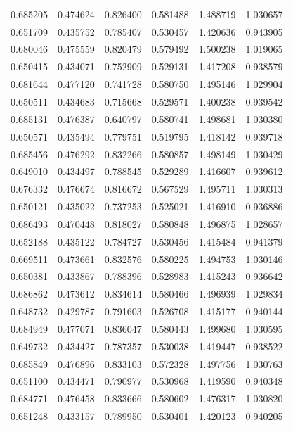 \begin{table}[htbp]
\begin{center}
\begin{tabular}{ |c|c|c|c|c|c| }
        0.685205 & 0.474624 & 0.826400 & 0.581488 & 1.488719 & 1.030657 \\
        0.651709 & 0.435752 & 0.785407 & 0.530457 & 1.420636 & 0.943905 \\
        0.680046 & 0.475559 & 0.820479 & 0.579492 & 1.500238 & 1.019065 \\
        0.650415 & 0.434071 & 0.752909 & 0.529131 & 1.417208 & 0.938579 \\
        0.681644 & 0.477120 & 0.741728 & 0.580750 & 1.495146 & 1.029904 \\
        0.650511 & 0.434683 & 0.715668 & 0.529571 & 1.400238 & 0.939542 \\
        0.685131 & 0.476387 & 0.640797 & 0.580741 & 1.498681 & 1.030380 \\
        0.650571 & 0.435494 & 0.779751 & 0.519795 & 1.418142 & 0.939718 \\
        0.685456 & 0.476292 & 0.832266 & 0.580857 & 1.498149 & 1.030429 \\
        0.649010 & 0.434497 & 0.788545 & 0.529289 & 1.416607 & 0.939612 \\
        0.676332 & 0.476674 & 0.816672 & 0.567529 & 1.495711 & 1.030313 \\
        0.650121 & 0.435022 & 0.737253 & 0.525021 & 1.416910 & 0.936886 \\
        0.686493 & 0.470448 & 0.818027 & 0.580848 & 1.496875 & 1.028657 \\
        0.652188 & 0.435122 & 0.784727 & 0.530456 & 1.415484 & 0.941379 \\
        0.669511 & 0.473661 & 0.832576 & 0.580225 & 1.494753 & 1.030146 \\
        0.650381 & 0.433867 & 0.788396 & 0.528983 & 1.415243 & 0.936642 \\
        0.686862 & 0.473612 & 0.834614 & 0.580466 & 1.496939 & 1.029834 \\
        0.648732 & 0.429787 & 0.791603 & 0.526708 & 1.415177 & 0.940144 \\
        0.684949 & 0.477071 & 0.836047 & 0.580443 & 1.499680 & 1.030595 \\
        0.649732 & 0.434427 & 0.787357 & 0.530038 & 1.419447 & 0.938522 \\
        0.685849 & 0.476896 & 0.833103 & 0.572328 & 1.497756 & 1.030763 \\
        0.651100 & 0.434471 & 0.790977 & 0.530968 & 1.419590 & 0.940348 \\
        0.684771 & 0.476458 & 0.833666 & 0.580602 & 1.476317 & 1.030820 \\
        0.651248 & 0.433157 & 0.789950 & 0.530401 & 1.420123 & 0.940205 \\
     \hline
    \end{tabular}
    \end{center}
    \label{intel-perf}
\end{table}

